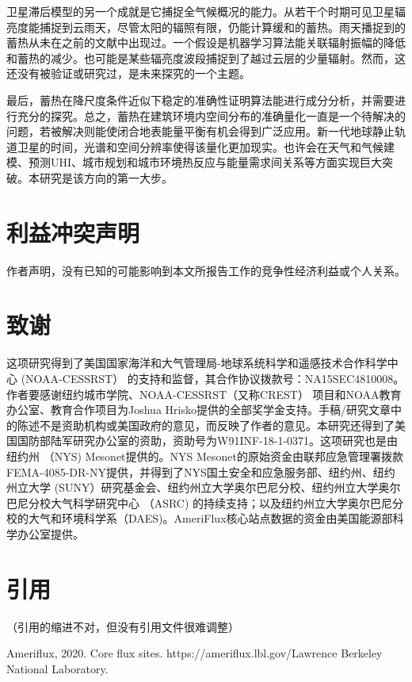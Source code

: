 \documentclass[3p,times]{elsarticle}
\begin{document}
卫星滞后模型的另一个成就是它捕捉全气候概况的能力。从若干个时期可见卫星辐亮度能捕捉到云雨天，尽管太阳的辐照有限，仍能计算缓和的蓄热。雨天播捉到的蓄热从未在之前的文献中出现过。一个假设是机器学习算法能关联辐射振幅的降低和蓄热的减少。也可能是某些辐亮度波段捕捉到了越过云层的少量辐射。然而，这还没有被验证或研究过，是未来探究的一个主题。

最后，蓄热在降尺度条件近似下稳定的准确性证明算法能进行成分分析，并需要进行充分的探究。总之，蓄热在建筑环境内空间分布的准确量化一直是一个待解决的问题，若被解决则能使闭合地表能量平衡有机会得到广泛应用。新一代地球静止轨道卫星的时间，光谱和空间分辨率使得该量化更加现实。也许会在天气和气候建模、预测UHI、城市规划和城市环境热反应与能量需求间关系等方面实现巨大突破。本研究是该方向的第一大步。

\section*{利益冲突声明}

作者声明，没有已知的可能影响到本文所报告工作的竞争性经济利益或个人关系。

\section*{致谢}

这项研究得到了美国国家海洋和大气管理局-地球系统科学和遥感技术合作科学中心 (NOAA-CESSRST） 的支持和监督，其合作协议拨款号：NA15SEC4810008。作者要感谢纽约城市学院、NOAA-CESSRST（又称CREST） 项目和NOAA教育办公室、教育合作项目为Joshua Hrisko提供的全部奖学金支持。手稿/研究文章中的陈述不是资助机构或美国政府的意见，而反映了作者的意见。本研究还得到了美国国防部陆军研究办公室的资助，资助号为W91INF-18-1-0371。这项研究也是由纽约州 （NYS) Mesonet提供的。NYS Mesonet的原始资金由联邦应急管理署拨款FEMA-4085-DR-NY提供，并得到了NYS国土安全和应急服务部、纽约州、纽约州立大学 (SUNY）研究基金会、纽约州立大学奥尔巴尼分校、纽约州立大学奥尔巴尼分校大气科学研究中心 （ASRC) 的持续支持；以及纽约州立大学奥尔巴尼分校的大气和环境科学系（DAES)。AmeriFlux核心站点数据的资金由美国能源部科学办公室提供。

\section*{引用}

（引用的缩进不对，但没有引用文件很难调整）

Ameriflux, 2020. Core flux sites. https://ameriflux.lbl.gov/Lawrence Berkeley National Laboratory.
\end{document}
